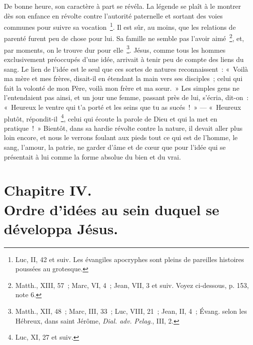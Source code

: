 \documentclass[french,twoside]{book} %
\newcommand\chapteropen{} %
\newcommand\chapterclose{} %
\begin{document}
De bonne heure, son caractère à part se révéla. La légende se plaît à le montrer dès son enfance en révolte contre l’autorité paternelle et sortant des voies communes pour suivre sa vocation \footnote{Luc, II, 42 et suiv. Les évangiles apocryphes sont pleins de pareilles histoires poussées au grotesque.}. Il est sûr, au moins, que les relations de parenté furent peu de chose pour lui. Sa famille ne semble pas l’avoir aimé \footnote{Matth., XIII, 57 ; Marc, VI, 4 ; Jean, VII, 3 et suiv. Voyez ci-dessous, p. 153, note 6.}, et, par moments, on le trouve dur pour elle \footnote{ Matth., XII, 48 ; Marc, III, 33 ; Luc, VIII, 21 ; Jean, II, 4 ; Évang. selon les Hébreux, dans saint Jérôme, {\itshape Dial. adv. Pelag}., III, 2.}. Jésus, comme tous les hommes exclusivement préoccupés d’une idée, arrivait à tenir peu de compte des liens du sang. Le lien de l’idée est le seul que ces sortes de natures reconnaissent : « Voilà ma mère et mes frères, disait-il en étendant la main vers ses disciples ; celui qui fait la volonté de mon Père, voilà mon frère et ma sœur. » Les simples gens ne l’entendaient pas ainsi, et un jour une femme, passant près de lui, s’écria, dit-on : « Heureux le ventre qui t’a porté et les seins que tu as sucés ! » — « Heureux plutôt, répondit-il \footnote{Luc, XI, 27 et suiv.}, celui qui écoute la parole de Dieu et qui la met en pratique ! » Bientôt, dans sa hardie révolte contre la nature, il devait aller plus loin encore, et nous le verrons foulant aux pieds tout ce qui est de l’homme, le sang, l’amour, la patrie, ne garder d’âme et de cœur que pour l’idée qui se présentait à lui comme la forme absolue du bien et du vrai.
\chapterclose


\chapteropen
\chapter[{Chapitre IV. Ordre d’idées au sein duquel se développa Jésus.}]{Chapitre IV.\\
Ordre d’idées au sein duquel se développa Jésus.}\renewcommand{\leftmark}{Chapitre IV.\\
Ordre d’idées au sein duquel se développa Jésus.}
\end{document}
